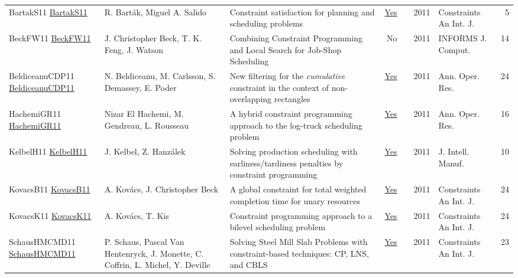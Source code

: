 {\begin{longtable}{p{3cm}p{6cm}p{7cm}rrrp{3cm}r}
BartakS11 \href{https://doi.org/10.1007/s10601-011-9109-4}{BartakS11} & R. Bart{\'{a}}k, Miguel A. Salido & Constraint satisfaction for planning and scheduling problems & \href{articles/BartakS11.pdf}{Yes} & \cite{BartakS11} & 2011 & Constraints An Int. J. & 5\\
BeckFW11 \href{https://doi.org/10.1287/ijoc.1100.0388}{BeckFW11} & J. Christopher Beck, T. K. Feng, J. Watson & Combining Constraint Programming and Local Search for Job-Shop Scheduling & No & \cite{BeckFW11} & 2011 & {INFORMS} J. Comput. & 14\\
BeldiceanuCDP11 \href{https://doi.org/10.1007/s10479-010-0731-0}{BeldiceanuCDP11} & N. Beldiceanu, M. Carlsson, S. Demassey, E. Poder & New filtering for the \emph{cumulative} constraint in the context of non-overlapping rectangles & \href{articles/BeldiceanuCDP11.pdf}{Yes} & \cite{BeldiceanuCDP11} & 2011 & Ann. Oper. Res. & 24\\
HachemiGR11 \href{https://doi.org/10.1007/s10479-010-0698-x}{HachemiGR11} & Nizar El Hachemi, M. Gendreau, L. Rousseau & A hybrid constraint programming approach to the log-truck scheduling problem & \href{articles/HachemiGR11.pdf}{Yes} & \cite{HachemiGR11} & 2011 & Ann. Oper. Res. & 16\\
KelbelH11 \href{https://doi.org/10.1007/s10845-009-0318-2}{KelbelH11} & J. Kelbel, Z. Hanz{\'{a}}lek & Solving production scheduling with earliness/tardiness penalties by constraint programming & \href{articles/KelbelH11.pdf}{Yes} & \cite{KelbelH11} & 2011 & J. Intell. Manuf. & 10\\
KovacsB11 \href{https://doi.org/10.1007/s10601-009-9088-x}{KovacsB11} & A. Kov{\'{a}}cs, J. Christopher Beck & A global constraint for total weighted completion time for unary resources & \href{articles/KovacsB11.pdf}{Yes} & \cite{KovacsB11} & 2011 & Constraints An Int. J. & 24\\
KovacsK11 \href{https://doi.org/10.1007/s10601-010-9102-3}{KovacsK11} & A. Kov{\'{a}}cs, T. Kis & Constraint programming approach to a bilevel scheduling problem & \href{articles/KovacsK11.pdf}{Yes} & \cite{KovacsK11} & 2011 & Constraints An Int. J. & 24\\
SchausHMCMD11 \href{https://doi.org/10.1007/s10601-010-9100-5}{SchausHMCMD11} & P. Schaus, Pascal Van Hentenryck, J. Monette, C. Coffrin, L. Michel, Y. Deville & Solving Steel Mill Slab Problems with constraint-based techniques: CP, LNS, and {CBLS} & \href{articles/SchausHMCMD11.pdf}{Yes} & \cite{SchausHMCMD11} & 2011 & Constraints An Int. J. & 23\\

\end{longtable}}
